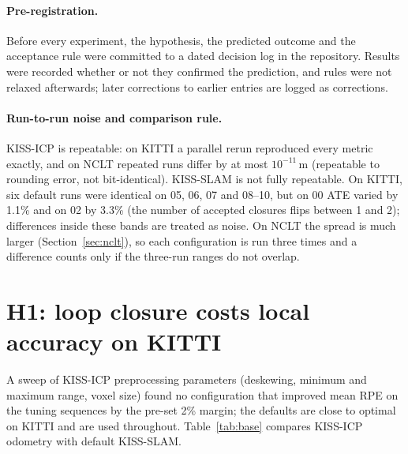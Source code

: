 \documentclass[11pt,a4paper]{article}
\begin{document}
\paragraph{Pre-registration.} Before every experiment, the hypothesis, the predicted outcome and the acceptance
rule were committed to a dated decision log in the repository. Results were recorded whether or not they
confirmed the prediction, and rules were not relaxed afterwards; later corrections to earlier entries are logged
as corrections.

\paragraph{Run-to-run noise and comparison rule.} KISS-ICP is repeatable: on KITTI a parallel rerun reproduced
every metric exactly, and on NCLT repeated runs differ by at most $10^{-11}$\,m (repeatable to rounding error, not
bit-identical). KISS-SLAM is not fully repeatable. On KITTI, six default runs were identical on 05, 06, 07 and
08--10, but on 00 ATE varied by 1.1\% and on 02 by 3.3\% (the number of accepted closures flips between 1 and 2);
differences inside these bands are treated as noise. On NCLT the spread is much larger (Section~\ref{sec:nclt}),
so each configuration is run three times and a difference counts only if the three-run ranges do not overlap.

\section{H1: loop closure costs local accuracy on KITTI}
\label{sec:baselines}
A sweep of KISS-ICP preprocessing parameters (deskewing, minimum and maximum range, voxel size) found no
configuration that improved mean RPE on the tuning sequences by the pre-set 2\% margin; the defaults are close to
optimal on KITTI and are used throughout. Table~\ref{tab:base} compares KISS-ICP odometry with default KISS-SLAM.
\end{document}
